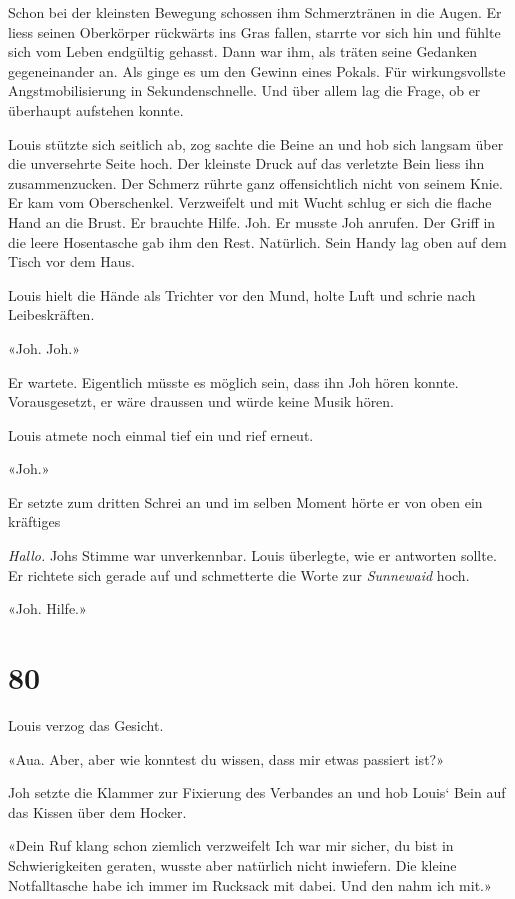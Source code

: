 Schon bei der kleinsten Bewegung schossen ihm Schmerztränen in die
Augen. Er liess seinen Oberkörper rückwärts ins Gras fallen, starrte vor
sich hin und fühlte sich vom Leben endgültig gehasst. Dann war ihm, als
träten seine Gedanken gegeneinander an. Als ginge es um den Gewinn eines
Pokals. Für wirkungsvollste Angstmobilisierung in Sekundenschnelle. Und
über allem lag die Frage, ob er überhaupt aufstehen konnte.

Louis stützte sich seitlich ab, zog sachte die Beine an und hob sich
langsam über die unversehrte Seite hoch. Der kleinste Druck auf das
verletzte Bein liess ihn zusammenzucken. Der Schmerz rührte ganz
offensichtlich nicht von seinem Knie. Er kam vom Oberschenkel.
Verzweifelt und mit Wucht schlug er sich die flache Hand an die Brust.
Er brauchte Hilfe. Joh. Er musste Joh anrufen. Der Griff in die leere
Hosentasche gab ihm den Rest. Natürlich. Sein Handy lag oben auf dem
Tisch vor dem Haus.

Louis hielt die Hände als Trichter vor den Mund, holte Luft und schrie
nach Leibeskräften.

«Joh. Joh.»

Er wartete. Eigentlich müsste es möglich sein, dass ihn Joh hören
konnte. Vorausgesetzt, er wäre draussen und würde keine Musik hören.

Louis atmete noch einmal tief ein und rief erneut.

«Joh.»

Er setzte zum dritten Schrei an und im selben Moment hörte er von oben
ein kräftiges

\emph{Hallo.} Johs Stimme war unverkennbar. Louis überlegte, wie er
antworten sollte. Er richtete sich gerade auf und schmetterte die Worte
zur \emph{Sunnewaid} hoch.

«Joh. Hilfe.»

\chapter{80}\label{section-80}

Louis verzog das Gesicht.

«Aua. Aber, aber wie konntest du wissen, dass mir etwas passiert ist?»

Joh setzte die Klammer zur Fixierung des Verbandes an und hob Louis`
Bein auf das Kissen über dem Hocker.

«Dein Ruf klang schon ziemlich verzweifelt Ich war mir sicher, du bist
in Schwierigkeiten geraten, wusste aber natürlich nicht inwiefern. Die
kleine Notfalltasche habe ich immer im Rucksack mit dabei. Und den nahm
ich mit.»

